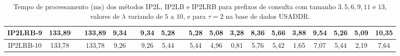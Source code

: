 \begin{table}[h]
{\begin{tabular}{c|c|c|c|c|c|c|c|c|c|c|c|c|c|c|c|c|c|c|}
\multicolumn{1}{|c|}{IP2LRB-9} & {\color[HTML]{656565} 133,89} & {\color[HTML]{656565} } & 133,89 & {\color[HTML]{656565} 9,34} & {\color[HTML]{656565} } & 9,34 & {\color[HTML]{656565} 5,28} & {\color[HTML]{656565} } & 5,28 & {\color[HTML]{656565} 5,08} & {\color[HTML]{656565} 3,28} & 8,36 & {\color[HTML]{656565} 5,66} & {\color[HTML]{656565} 3,88} & 9,54 & {\color[HTML]{656565} 5,26} & {\color[HTML]{656565} 5,09} & 10,35 \\ \hline
\multicolumn{1}{|c|}{IP2LRB-10} & {\color[HTML]{656565} 133,78} & {\color[HTML]{656565} } & 133,78 & {\color[HTML]{656565} 9,26} & {\color[HTML]{656565} } & 9,26 & {\color[HTML]{656565} 5,44} & {\color[HTML]{656565} } & 5,44 & {\color[HTML]{656565} 4,96} & {\color[HTML]{656565} 0,81} & 5,76 & {\color[HTML]{656565} 5,42} & {\color[HTML]{656565} 1,65} & 7,07 & {\color[HTML]{656565} 5,44} & {\color[HTML]{656565} 2,19} & 7,64 \\ \hline
\end{tabular}%
}
\caption{Tempo de processamento (ms) dos métodos IP2L, IP2LB e IP2LRB para prefixos de consulta com tamanho $3,5,6,9,11$ e $13$, valores de $\lambda$ variando de $5$ a $10$, e para $\tau=2$ na base de dados USADDR.}
\label{tab:methods-processing-time-tau-2-USADDR}
\end{table}

